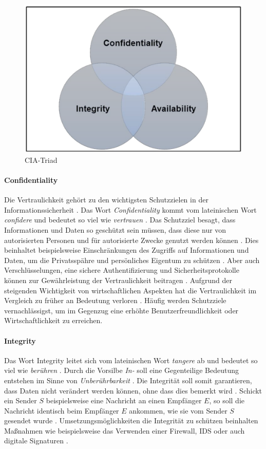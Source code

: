 \begin{figure}[h]
	\centering 
	\includegraphics[width=0.5
    \textwidth]{img/abbildungen/CIA-Triad.png}
	\captionsetup{format=hang}
	\caption{CIA-Triad} \label{CIA-Triad}
\end{figure}

\paragraph*{Confidentiality} 
Die Vertraulichkeit gehört zu den wichtigsten Schutzzielen in der Informationssicherheit \cite{samonas2014cia}. Das Wort \textit{Confidentiality} kommt vom lateinischen Wort \textit{confidere} und bedeutet so viel wie \textit{vertrauen} \cite{pons} \cite{samonas2014cia}. Das Schutzziel besagt, dass Informationen und Daten so geschützt sein müssen, dass diese nur von autorisierten Personen und für autorisierte Zwecke genutzt werden können \cite{samonas2014cia}. 
Dies beinhaltet beispielsweise Einschränkungen des Zugriffs auf Informationen und Daten, um die Privatsspähre und persönliches Eigentum zu schützen \cite{samonas2014cia}. Aber auch Verschlüsselungen, eine sichere Authentifizierung und Sicherheitsprotokolle können zur Gewährleistung der Vertraulichkeit beitragen \cite{agarwal2011security}.
Aufgrund der steigenden Wichtigkeit von wirtschaftlichen Aspekten hat die Vertraulichkeit im Vergleich zu früher an Bedeutung verloren \cite{samonas2014cia}. Häufig werden Schutzziele vernachlässigst, um im Gegenzug eine erhöhte Benutzerfreundlichkeit oder Wirtschaftlichkeit zu erreichen.

\paragraph*{Integrity}  
Das Wort Integrity leitet sich vom lateinischen Wort \textit{tangere} ab und bedeutet so viel wie \textit{berühren} \cite{pons}. Durch die Vorsilbe \textit{In-} soll eine Gegenteilige Bedeutung entstehen im Sinne von \textit{Unberührbarkeit} \cite{samonas2014cia}. 
Die Integrität soll somit garantieren, dass Daten nicht verändert werden können, ohne dass dies bemerkt wird \cite{agarwal2011security}. Schickt ein Sender $S$ beispielsweise eine Nachricht an einen Empfänger $E$, so soll die Nachricht identisch beim Empfänger $E$ ankommen, wie sie vom Sender $S$ gesendet wurde \cite{agarwal2011security}.
Umsetzungsmöglichkeiten die Integrität zu schützen beinhalten Maßnahmen wie beispielsweise das Verwenden einer Firewall, \ac{IDS} oder auch digitale Signaturen \cite{agarwal2011security}.
